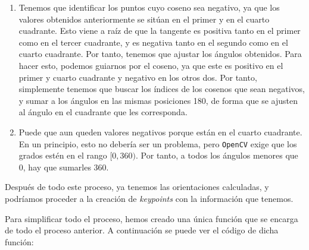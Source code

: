 \documentclass[11pt,a4paper]{article}
\begin{document}
\begin{enumerate}
	\item Tenemos que identificar los puntos cuyo coseno sea negativo, ya que los valores
	obtenidos anteriormente se sitúan en el primer y en el cuarto cuadrante. Esto viene a raíz
	de que la tangente es positiva tanto en el primer como en el tercer cuadrante, y es negativa
	tanto en el segundo como en el cuarto cuadrante.  Por tanto, tenemos que ajustar los ángulos
	obtenidos. Para hacer esto, podemos guiarnos por el coseno, ya que este es positivo en el primer
	y cuarto cuadrante y negativo en los otros dos. Por tanto, simplemente tenemos que buscar los
	índices de los cosenos que sean negativos, y sumar a los ángulos en las mismas posiciones
	180, de forma que se ajusten al ángulo en el cuadrante que les corresponda.
	\item Puede que aun queden valores negativos porque están en el cuarto cuadrante. En un principio,
	esto no debería ser un problema, pero \texttt{OpenCV} exige que los grados estén en el rango
	$[0, 360)$. Por tanto, a todos los ángulos menores que 0, hay que sumarles 360.
\end{enumerate}

Después de todo este proceso, ya tenemos las orientaciones calculadas, y podríamos
proceder a la creación de \textit{keypoints} con la información que tenemos.

Para simplificar todo el proceso, hemos creado una única función que se encarga de
todo el proceso anterior. A continuación se puede ver el código de dicha función:
\end{document}
